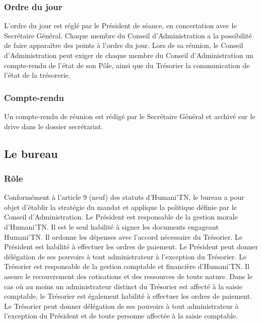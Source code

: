 \documentclass[12pt]{article}
\begin{document}
\subsubsection{Ordre du jour}
\label{sec:entites_decisionnelles:conseil_admin:ordre_jour}

L’ordre du jour est réglé par le Président de séance, en concertation avec le Secrétaire Général. Chaque
membre du Conseil d’Administration a la possibilité de faire apparaître des points à l’ordre du jour.
Lors de sa réunion, le Conseil d’Administration peut exiger de chaque membre du Conseil d’Administration
un compte-rendu de l’état de son Pôle, ainsi que du Trésorier la communication de l’état de la trésorerie.

\subsubsection{Compte-rendu}
\label{sec:entites_decisionnelles:conseil_admin:compte_rendu}

Un compte-rendu de réunion est rédigé par le Secrétaire Général et archivé sur le drive dans le dossier
secrétariat.

\subsection{Le bureau}
\label{sec:entites_decisionnelles:bureau}


\subsubsection{Rôle}
\label{sec:entites_decisionnelles:bureau:role}

Conformément à l’article 9 (neuf) des statuts d’Humani'TN, le bureau a pour objet d’établir la stratégie du
mandat et applique la politique définie par le Conseil d’Administration.
Le Président est responsable de la gestion morale d’Humani'TN. Il est le seul habilité à signer les documents
engageant Humani'TN. Il ordonne les dépenses avec l’accord nécessaire du Trésorier.
Le Président est habilité à effectuer les ordres de paiement.
Le Président peut donner délégation de ses pouvoirs à tout administrateur à l’exception du Trésorier.
Le Trésorier est responsable de la gestion comptable et financière d’Humani'TN. Il assure le recouvrement
des cotisations et des ressources de toute nature.
Dans le cas où au moins un administrateur distinct du Trésorier est affecté à la saisie comptable, le Trésorier
est également habilité à effectuer les ordres de paiement.
Le Trésorier peut donner délégation de ses pouvoirs à tout administrateur à l’exception du Président et de
toute personne affectée à la saisie comptable.
\end{document}
